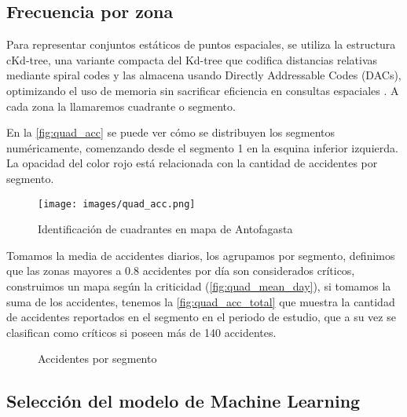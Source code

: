 \documentclass[12pt]{article}
\begin{document}
\subsection{Frecuencia por zona}

Para representar conjuntos estáticos de puntos espaciales, se utiliza la estructura cKd-tree, una variante compacta del Kd-tree que codifica distancias relativas mediante spiral codes y las almacena usando Directly Addressable Codes (DACs), optimizando el uso de memoria sin sacrificar eficiencia en consultas espaciales \parencite{gutierrez2023ckdtree}. A cada zona la llamaremos cuadrante o segmento.

En la \autoref{fig:quad_acc} se puede ver cómo se distribuyen los segmentos numéricamente, comenzando desde el segmento 1 en la esquina inferior izquierda. La opacidad del color rojo está relacionada con la cantidad de accidentes por segmento.

\begin{figure}[H]
    \centering
    \texttt{[image: images/quad\_acc.png]}
    \caption{Identificación de cuadrantes en mapa de Antofagasta}
    \label{fig:quad_acc}
\end{figure}

Tomamos la media de accidentes diarios, los agrupamos por segmento, definimos que las zonas mayores a 0.8 accidentes por día son considerados críticos, construimos un mapa según la criticidad (\autoref{fig:quad_mean_day}), si tomamos la suma de los accidentes, tenemos la \autoref{fig:quad_acc_total} que muestra la cantidad de accidentes reportados en el segmento en el periodo de estudio, que a su vez se clasifican como críticos si poseen más de 140 accidentes.


\begin{figure}[H]
    \centering
    \caption{Accidentes por segmento}
\end{figure}




\subsection{Selección del modelo de Machine Learning}
\end{document}
